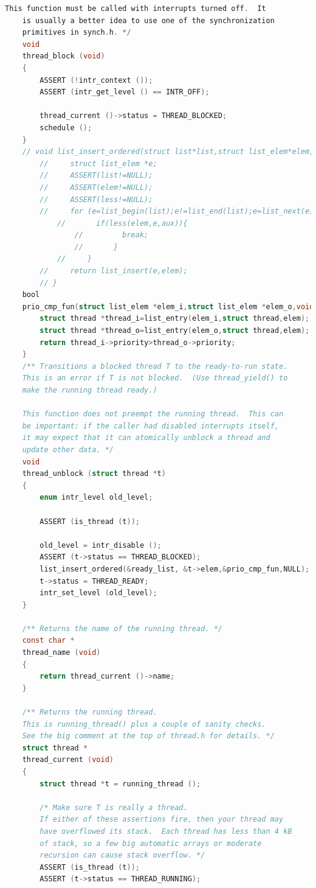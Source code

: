 \documentclass{article}
\begin{document}
\begin{lstlisting}[language=C, title=\texttt{thread.c}]
	This function must be called with interrupts turned off.  It
	is usually a better idea to use one of the synchronization
	primitives in synch.h. */
	void
	thread_block (void) 
	{
		ASSERT (!intr_context ());
		ASSERT (intr_get_level () == INTR_OFF);
		
		thread_current ()->status = THREAD_BLOCKED;
		schedule ();
	}
	// void list_insert_ordered(struct list*list,struct list_elem*elem,list_less_func *less,void *aux){
		//     struct list_elem *e;
		//     ASSERT(list!=NULL);
		//     ASSERT(elem!=NULL);
		//     ASSERT(less!=NULL);
		//     for (e=list_begin(list);e!=list_end(list);e=list_next(e)){
			//       if(less(elem,e,aux)){
				//         break;
				//       }
			//     }
		//     return list_insert(e,elem);
		// }
	bool
	prio_cmp_fun(struct list_elem *elem_i,struct list_elem *elem_o,void *add_debug_prefix_map){
		struct thread *thread_i=list_entry(elem_i,struct thread,elem);
		struct thread *thread_o=list_entry(elem_o,struct thread,elem);
		return thread_i->priority>thread_o->priority;
	}
	/** Transitions a blocked thread T to the ready-to-run state.
	This is an error if T is not blocked.  (Use thread_yield() to
	make the running thread ready.)
	
	This function does not preempt the running thread.  This can
	be important: if the caller had disabled interrupts itself,
	it may expect that it can atomically unblock a thread and
	update other data. */
	void
	thread_unblock (struct thread *t) 
	{
		enum intr_level old_level;
		
		ASSERT (is_thread (t));
		
		old_level = intr_disable ();
		ASSERT (t->status == THREAD_BLOCKED);
		list_insert_ordered(&ready_list, &t->elem,&prio_cmp_fun,NULL);
		t->status = THREAD_READY;
		intr_set_level (old_level);
	}
	
	/** Returns the name of the running thread. */
	const char *
	thread_name (void) 
	{
		return thread_current ()->name;
	}
	
	/** Returns the running thread.
	This is running_thread() plus a couple of sanity checks.
	See the big comment at the top of thread.h for details. */
	struct thread *
	thread_current (void) 
	{
		struct thread *t = running_thread ();
		
		/* Make sure T is really a thread.
		If either of these assertions fire, then your thread may
		have overflowed its stack.  Each thread has less than 4 kB
		of stack, so a few big automatic arrays or moderate
		recursion can cause stack overflow. */
		ASSERT (is_thread (t));
		ASSERT (t->status == THREAD_RUNNING);
		

\end{lstlisting}
\end{document}
